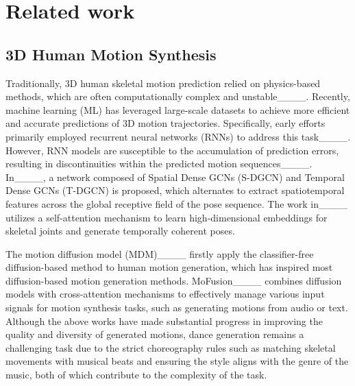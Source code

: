 \section{Related work}
\subsection{3D Human Motion Synthesis }
Traditionally, 3D human skeletal motion prediction relied on physics-based methods, which are often computationally complex and unstable____. 
Recently, machine learning (ML) has leveraged large-scale datasets to achieve more efficient and accurate predictions of 3D motion trajectories. 
Specifically, early efforts primarily employed recurrent neural networks (RNNs) to address this task____. However, RNN models are susceptible to the accumulation of prediction errors, resulting in discontinuities within the predicted motion sequences____. In____, a network composed of Spatial Dense GCNs (S-DGCN) and Temporal Dense GCNs (T-DGCN) is proposed, which alternates to extract spatiotemporal features across the global receptive field of the pose sequence. The work in____ utilizes a self-attention mechanism to learn high-dimensional embeddings for skeletal joints and generate temporally coherent poses. 

The motion diffusion model (MDM)____ firstly apply the classifier-free diffusion-based method to human motion generation, which has inspired most diffusion-based motion generation methods.
MoFusion____ combines diffusion models with cross-attention mechanisms to effectively manage various input signals for motion synthesis tasks, such as generating motions from audio or text.
Although the above works have made substantial progress in improving the quality and diversity of generated motions, dance generation remains a challenging task due to the strict choreography rules such as matching skeletal movements with musical beats and ensuring the style aligns with the genre of the music, both of which contribute to the complexity of the task.
